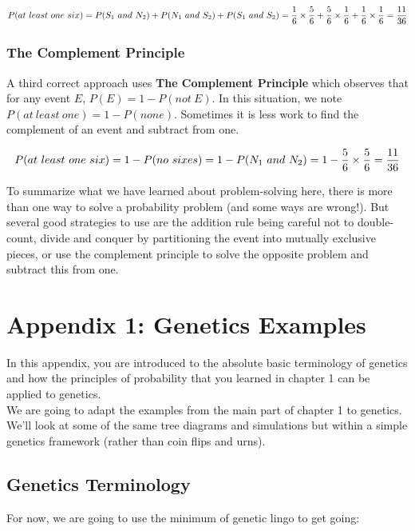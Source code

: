 \documentclass[]{book}
\theoremstyle{definition}
\theoremstyle{definition}
\theoremstyle{definition}
\theoremstyle{remark}
\begin{document}
\[P(at\ least\ one\ six) = P(S_{1}\ and\ N_{2}) + P(N_{1}\ and\ S_{2}) + P(S_{1}\ and\ S_{2}) = \\  \frac{1}{6} \times \frac{5}{6} + \frac{5}{6} \times \frac{1}{6} + \frac{1}{6} \times \frac{1}{6} = \frac{11}{36}\]

\subsubsection{The Complement Principle}\label{the-complement-principle}

A third correct approach uses \textbf{The Complement Principle} which
observes that for any event \(E\), \(P(E) = 1 - P(not\ E)\). In this
situation, we note \(P(at\ least\ one) = 1 - P(none)\). Sometimes it is
less work to find the complement of an event and subtract from one.

\[P(at\ least\ one\ six) = 1 - P(no\ sixes) = 1 - P(N_{1}\ and\ N_{2}) = \\  1 - \frac{5}{6} \times \frac{5}{6} = \frac{11}{36}\]

To summarize what we have learned about problem-solving here, there is
more than one way to solve a probability problem (and some ways are
wrong!). But several good strategies to use are the addition rule being
careful not to double-count, divide and conquer by partitioning the
event into mutually exclusive pieces, or use the complement principle to
solve the opposite problem and subtract this from one.

\section{Appendix 1: Genetics
Examples}\label{appendix-1-genetics-examples}

In this appendix, you are introduced to the absolute basic terminology
of genetics and how the principles of probability that you learned in
chapter 1 can be applied to genetics.\\
We are going to adapt the examples from the main part of chapter 1 to
genetics. We'll look at some of the same tree diagrams and simulations
but within a simple genetics framework (rather than coin flips and
urns).

\subsection{Genetics Terminology}\label{genetics-terminology}

For now, we are going to use the minimum of genetic lingo to get going:
\end{document}
